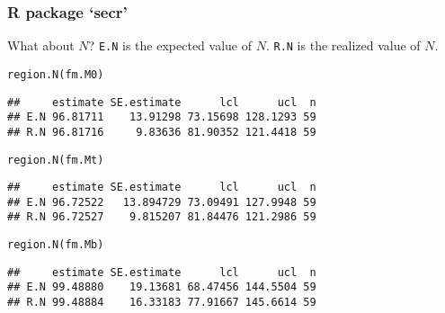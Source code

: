 \documentclass[color=usenames,dvipsnames]{beamer}\usepackage[]{graphicx}\usepackage[]{color}
\makeatletter
\newcommand{\hlstd}[1]{\textcolor[rgb]{0,0,0}{#1}}%
\newcommand{\hlkwd}[1]{\textcolor[rgb]{0.004,0.004,0.506}{#1}}%
\newenvironment{kframe}{%
 \def\at@end@of@kframe{}%
 \ifinner\ifhmode%
  \def\at@end@of@kframe{\end{minipage}}%
  \begin{minipage}{\columnwidth}%
 \fi\fi%
 \def\FrameCommand##1{\hskip\@totalleftmargin \hskip-\fboxsep
 \colorbox{shadecolor}{##1}\hskip-\fboxsep
     \hskip-\linewidth \hskip-\@totalleftmargin \hskip\columnwidth}%
 \MakeFramed {\advance\hsize-\width
   \@totalleftmargin\z@ \linewidth\hsize
   \@setminipage}}%
 {\par\unskip\endMakeFramed%
 \at@end@of@kframe}
\newenvironment{knitrout}{}{} %
\newcommand{\inr}[1]{\colorbox{inlinecolor}{\texttt{#1}}}
\makeatother
\begin{document}
\begin{frame}[fragile]
  \frametitle{R package `secr'}
  What about $N$? \pause \inr{E.N} is the expected value of
  $N$. \inr{R.N} is the realized value of $N$. 
  \vfill
\begin{knitrout}\footnotesize
{}\color{fgcolor}\begin{kframe}
\begin{alltt}
\hlkwd{region.N}\hlstd{(fm.M0)}
\end{alltt}
\begin{verbatim}
##     estimate SE.estimate      lcl      ucl  n
## E.N 96.81711    13.91298 73.15698 128.1293 59
## R.N 96.81716     9.83636 81.90352 121.4418 59
\end{verbatim}
\end{kframe}
\end{knitrout}
  \pause
\begin{knitrout}\footnotesize
{}\color{fgcolor}\begin{kframe}
\begin{alltt}
\hlkwd{region.N}\hlstd{(fm.Mt)}
\end{alltt}
\begin{verbatim}
##     estimate SE.estimate      lcl      ucl  n
## E.N 96.72522   13.894729 73.09491 127.9948 59
## R.N 96.72527    9.815207 81.84476 121.2986 59
\end{verbatim}
\end{kframe}
\end{knitrout}
  \pause
\begin{knitrout}\footnotesize
{}\color{fgcolor}\begin{kframe}
\begin{alltt}
\hlkwd{region.N}\hlstd{(fm.Mb)}
\end{alltt}
\begin{verbatim}
##     estimate SE.estimate      lcl      ucl  n
## E.N 99.48880    19.13681 68.47456 144.5504 59
## R.N 99.48884    16.33183 77.91667 145.6614 59
\end{verbatim}
\end{kframe}
\end{knitrout}
\end{frame}
\end{document}
